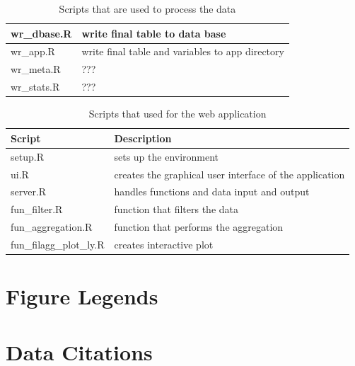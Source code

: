 \documentclass[english]{article}
\begin{document}
\begin{table}[h!]
\begin{tabular}{|l|l|}
wr\_dbase.R                 & write final table to data base                   \\ \hline
wr\_app.R                   & write final table and variables to app directory \\ \hline
wr\_meta.R                  & ???                                              \\ \hline
wr\_stats.R                 & ???                                              \\ \hline
\end{tabular}
\caption{Scripts that are used to process the data}
\label{tab:scripts-pipeline}
\end{table}

\begin{table}[h!]
\begin{tabular}{|l|l|}
\hline
Script                     & Description                                               \\ \hline
setup.R                    & sets up the environment                                   \\ \hline
ui.R                       & creates the graphical user interface of the application   \\ \hline
server.R                   & handles functions and data input and output               \\ \hline
fun\_filter.R              & function that filters the data                            \\ \hline
fun\_aggregation.R         & function that performs the aggregation                    \\ \hline
fun\_filagg\_plot\_ly.R    & creates interactive plot                                  \\ \hline
\end{tabular}
\caption{Scripts that used for the web application}
\label{tab:scripts-app}
\end{table}


\section*{Figure Legends}




\section*{Data Citations}
\end{document}
